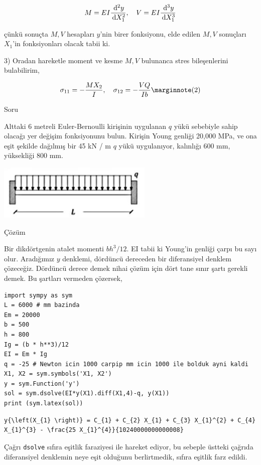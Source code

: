 \documentclass[12pt,fleqn]{article}\usepackage{../../common}
\begin{document}
$$
M = E I \frac{\,\mathrm{d}^2 y}{\,\mathrm{d} X_1^2}, \quad
V = E I \frac{\,\mathrm{d}^3 y}{\,\mathrm{d} X_1^3} 
$$

çünkü sonuçta $M,V$ hesapları $y$'nin birer fonksiyonu, elde edilen $M,V$
sonuçları $X_1$'in fonksiyonları olacak tabii ki.

3) Oradan hareketle moment ve kesme $M,V$ bulunanca stres bileşenlerini
bulabilirim,

$$
\sigma_{11} = -\frac{M X_2}{I}, \quad
\sigma_{12} = -\frac{VQ}{I b}
\mlabel{2}
$$

Soru

Alttaki 6 metreli Euler-Bernoulli kirişinin uygulanan $q$ yükü sebebiyle sahip
olacağı yer değişim fonksiyonunu bulun. Kirişin Young genliği 20,000 MPa, ve ona
eşit şekilde dağılmış bir 45 kN / m $q$ yükü uygulanıyor, kalınlığı 600 mm,
yüksekliği 800 mm.

\includegraphics[width=20em]{phy_020_strs_03_02.jpg}

Çözüm

Bir dikdörtgenin atalet momenti $b h^3 / 12$. EI tabii ki Young'in genliği çarpı
bu sayı olur. Aradığımız $y$ denklemi, dördüncü dereceden bir diferansiyel
denklem çözeceğiz. Dördüncü derece demek nihai çözüm için dört tane sınır
şartı gerekli demek. Bu şartları vermeden çözersek,

\begin{verbatim}
import sympy as sym
L = 6000 # mm bazinda
Em = 20000
b = 500
h = 800
Ig = (b * h**3)/12
EI = Em * Ig
q = -25 # Newton icin 1000 carpip mm icin 1000 ile bolduk ayni kaldi
X1, X2 = sym.symbols('X1, X2')
y = sym.Function('y')
sol = sym.dsolve(EI*y(X1).diff(X1,4)-q, y(X1))
print (sym.latex(sol))
\end{verbatim}

\begin{verbatim}
y{\left(X_{1} \right)} = C_{1} + C_{2} X_{1} + C_{3} X_{1}^{2} + C_{4} X_{1}^{3} - \frac{25 X_{1}^{4}}{10240000000000008}
\end{verbatim}

Çağrı \verb!dsolve! sıfıra eşitlik faraziyesi ile hareket ediyor, bu sebeple
üstteki çağrıda diferansiyel denklemin neye eşit olduğunu berlirtmedik, sıfıra
eşitlik farz edildi.
\end{document}
